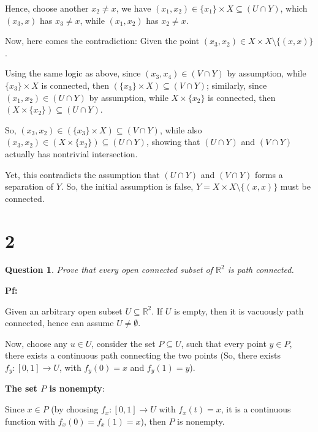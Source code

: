 \documentclass{article}
\newtheorem{question}{Question}
\begin{document}
Hence, choose another $x_2\neq x$, we have $(x_1,x_2)\in \{x_1\}\times X\subseteq (U\cap Y)$, which $(x_3,x)$ has $x_3\neq x$, while $(x_1,x_2)$ has $x_2\neq x$.

\hfil

Now, here comes the contradiction: Given the point $(x_3,x_2)\in X\times X\setminus\{(x,x)\}$.

Using the same logic as above, since $(x_3,x_4)\in (V\cap Y)$ by assumption, while $\{x_3\}\times X$ is connected, then $(\{x_3\}\times X)\subseteq (V\cap Y)$;
similarly, since $(x_1,x_2)\in (U\cap Y)$ by assumption, while $X\times \{x_2\}$ is connected, then $(X\times \{x_2\})\subseteq (U\cap Y)$.

So, $(x_3,x_2)\in (\{x_3\}\times X)\subseteq (V\cap Y)$, while also $(x_3,x_2)\in (X\times \{x_2\})\subseteq (U\cap Y)$, showing that $(U\cap Y)$ and $(V\cap Y)$ actually has nontrivial intersection.

Yet, this contradicts the assumption that $(U\cap Y)$ and $(V\cap Y)$ forms a separation of $Y$.
So, the initial assumption is false, $Y=X\times X\setminus\{(x,x)\}$ must be connected.

\break

\section*{2}
\begin{myBox}[]{}
    \begin{question}
        Prove that every open connected subset of $\mathbb{R}^2$ is path connected.
    \end{question}
\end{myBox}

\textbf{Pf:}

Given an arbitrary open subset $U\subseteq \mathbb{R}^2$. If $U$ is empty, then it is vacuously path connected, hence can assume $U\neq \emptyset$.

Now, choose any $u\in U$, consider the set $P\subseteq U$, such that every point $y\in P$, there exists a continuous path connecting the two points (So, 
there exists $f_y:[0,1]\rightarrow U$, with $f_y(0)=x$ and $f_y(1)=y$).

\hfil

\textbf{The set $P$ is nonempty}: 

Since $x\in P$ (by choosing $f_x:[0,1]\rightarrow U$ with $f_x(t)=x$, it is a continuous function with $f_x(0)=f_x(1)=x$), then $P$ is nonempty.

\hfil
\end{document}
